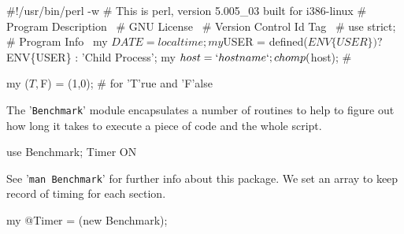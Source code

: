\documentclass[11pt]{article}
\def\nwendcode{\endtrivlist \endgroup} %
\let\nwdocspar=\par                    %
\begin{document}
%
\newpage %



\nwenddocs{}\endmoddef
#!/usr/bin/perl -w
# This is perl, version 5.005_03 built for i386-linux
#
\LA{}Program Description~{\nwtagstyle{}}\RA{}
#
\LA{}GNU License~{\nwtagstyle{}}\RA{}
#
\LA{}Version Control Id Tag~{\nwtagstyle{}}\RA{}
#
use strict;
#
\LA{}Program Info~{\nwtagstyle{}}\RA{}
my $DATE = localtime;
my $USER = defined($ENV\{USER\}) ? $ENV\{USER\} : 'Child Process';
my $host = `hostname`;
chomp($host);
#
\nwendcode{}\nwdocspar

\nwenddocs{}\endmoddef
my ($T,$F) = (1,0); # for 'T'rue and 'F'alse
\nwendcode{}\nwdocspar


The '{\tt{}Benchmark}' module encapsulates a number of routines to help to figure out how long it takes to execute a piece of code and the whole script.

\nwenddocs{}\endmoddef
use Benchmark;
  \LA{}Timer ON~{\nwtagstyle{}}\RA{}
\nwendcode{}\nwdocspar

See '{\tt{}man\ Benchmark}' for further info about this package. 
We set an array to keep record of timing for each section.

\nwenddocs{}\endmoddef
my @Timer = (new Benchmark);
\nwendcode{}\nwdocspar
\end{document}
